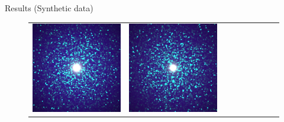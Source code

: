 \documentclass[final]{beamer}
\newlength{\twocolwid}
\newlength{\resultwidth}
\begin{document}
\begin{frame}[t]
\begin{columns}[t]
\begin{column}{\twocolwid}
\begin{block}{Results (Synthetic data)}
\begin{figure}[t]
\begin{tabular}{ccrclcccc}
            		\includegraphics[width=\resultwidth]{images/synth/flake/good1.jpg} &
            		\includegraphics[width=\resultwidth]{images/synth/flake/good2.jpg} &

\end{tabular}
\end{figure}
\end{block}
\end{column}
\end{columns}
\end{frame}
\end{document}
